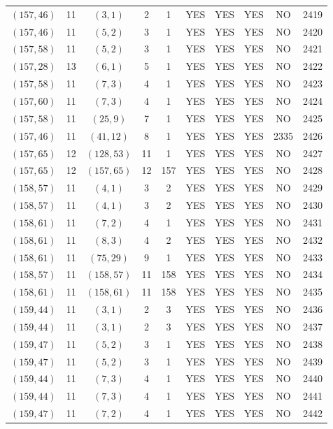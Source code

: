 \begin{longtable}{|c|c|c|c|c|c|c|c|c|c|}
$(157, 46)$ & 11 & $(3, 1)$ & 2 & 1 & YES & YES & YES & NO & 2419\\
$(157, 46)$ & 11 & $(5, 2)$ & 3 & 1 & YES & YES & YES & NO & 2420\\
$(157, 58)$ & 11 & $(5, 2)$ & 3 & 1 & YES & YES & YES & NO & 2421\\
$(157, 28)$ & 13 & $(6, 1)$ & 5 & 1 & YES & YES & YES & NO & 2422\\
$(157, 58)$ & 11 & $(7, 3)$ & 4 & 1 & YES & YES & YES & NO & 2423\\
$(157, 60)$ & 11 & $(7, 3)$ & 4 & 1 & YES & YES & YES & NO & 2424\\
$(157, 58)$ & 11 & $(25, 9)$ & 7 & 1 & YES & YES & YES & NO & 2425\\
$(157, 46)$ & 11 & $(41, 12)$ & 8 & 1 & YES & YES & YES & 2335 & 2426\\
$(157, 65)$ & 12 & $(128, 53)$ & 11 & 1 & YES & YES & YES & NO & 2427\\
$(157, 65)$ & 12 & $(157, 65)$ & 12 & 157 & YES & YES & YES & NO & 2428\\
$(158, 57)$ & 11 & $(4, 1)$ & 3 & 2 & YES & YES & YES & NO & 2429\\
$(158, 57)$ & 11 & $(4, 1)$ & 3 & 2 & YES & YES & YES & NO & 2430\\
$(158, 61)$ & 11 & $(7, 2)$ & 4 & 1 & YES & YES & YES & NO & 2431\\
$(158, 61)$ & 11 & $(8, 3)$ & 4 & 2 & YES & YES & YES & NO & 2432\\
$(158, 61)$ & 11 & $(75, 29)$ & 9 & 1 & YES & YES & YES & NO & 2433\\
$(158, 57)$ & 11 & $(158, 57)$ & 11 & 158 & YES & YES & YES & NO & 2434\\
$(158, 61)$ & 11 & $(158, 61)$ & 11 & 158 & YES & YES & YES & NO & 2435\\
$(159, 44)$ & 11 & $(3, 1)$ & 2 & 3 & YES & YES & YES & NO & 2436\\
$(159, 44)$ & 11 & $(3, 1)$ & 2 & 3 & YES & YES & YES & NO & 2437\\
$(159, 47)$ & 11 & $(5, 2)$ & 3 & 1 & YES & YES & YES & NO & 2438\\
$(159, 47)$ & 11 & $(5, 2)$ & 3 & 1 & YES & YES & YES & NO & 2439\\
$(159, 44)$ & 11 & $(7, 3)$ & 4 & 1 & YES & YES & YES & NO & 2440\\
$(159, 44)$ & 11 & $(7, 3)$ & 4 & 1 & YES & YES & YES & NO & 2441\\
$(159, 47)$ & 11 & $(7, 2)$ & 4 & 1 & YES & YES & YES & NO & 2442\\

\end{longtable}
